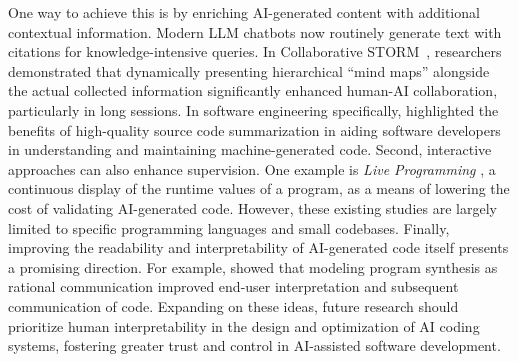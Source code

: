 One way to achieve this is by enriching AI-generated content with additional contextual information. Modern LLM chatbots now routinely generate text with citations for knowledge-intensive queries. In Collaborative STORM~\citep{jiang2024into}, researchers demonstrated that dynamically presenting hierarchical ``mind maps'' alongside the actual collected information significantly enhanced human-AI collaboration, particularly in long sessions. In software engineering specifically, \citet{sun2024source} highlighted the benefits of high-quality source code summarization in aiding software developers in understanding and maintaining machine-generated code. Second, interactive approaches can also enhance supervision. One example is \textit{Live Programming} \citep{ferdowsi2024validating}, a continuous display of the runtime values of a program, as a means of lowering the cost of validating AI-generated code. However, these existing studies are largely limited to specific programming languages and small codebases. Finally, improving the readability and interpretability of AI-generated code itself presents a promising direction. For example, \citet{pu2020program} showed that modeling program synthesis as rational communication improved end-user interpretation and subsequent communication of code. Expanding on these ideas, future research should prioritize human interpretability in the design and optimization of AI coding systems, fostering greater trust and control in AI-assisted software development.
















